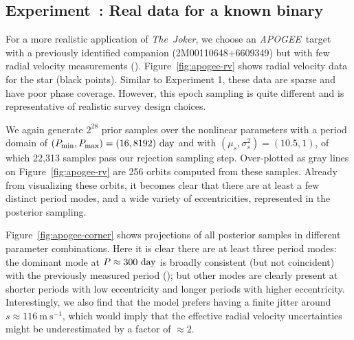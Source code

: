 \documentclass[manuscript, letterpaper]{aastex6}
\newcommand{\project}[1]{\textsl{#1}}
\newcommand{\acronym}[1]{{\small{#1}}}
\newcommand{\apogee}{\project{\acronym{APOGEE}}}
\newcommand{\samplername}{\project{The~Joker}}
\newcommand{\figname}{Figure}
\newcommand{\mps}{\mathrm{m}~\mathrm{s}^{-1}}
\newcounter{expcounter}
\begin{document}
\subsection{Experiment~: Real data for a known binary}
\label{sec:apogee}

For a more realistic application of \samplername, we choose an \apogee\ target
with a previously identified companion (2M00110648+6609349) but with few radial
velocity measurements (\citealt{Troup:2016}).
\figname~\ref{fig:apogee-rv} shows radial velocity data for the star (black
points). %
Similar to Experiment 1, these data are sparse and have poor phase coverage.
However, this epoch sampling is quite different and is representative of realistic
survey design choices.

We again generate $2^{28}$ prior samples over the nonlinear parameters with a
period domain of $(P_{\rm min}, P_{\rm max}) = (16, 8192)~{\rm day}$ and with
$(\mu_s,\sigma^2_s) = (10.5,1)$, of which 22,313 samples pass our rejection
sampling step.
Over-plotted as gray lines on \figname~\ref{fig:apogee-rv} are 256 orbits
computed from these samples.
Already from visualizing these orbits, it becomes clear that there are at least a few
distinct period modes, and a wide variety of eccentricities, represented in the
posterior sampling.

\figname~\ref{fig:apogee-corner} shows projections of all posterior samples in
different parameter combinations.
Here it is clear there are at least three period modes: the dominant mode at $P
\approx 300~{\rm day}$ is broadly consistent (but not coincident) with the previously measured period
(\citealt{Troup:2016}); but other modes are clearly present at shorter periods
with low eccentricity and longer periods with higher eccentricity.
Interestingly, we also find that the model prefers having a finite jitter
around $s \approx 116~\mps$, which would imply that the effective radial velocity
uncertainties might be underestimated by a factor of $\approx 2$.
\end{document}
